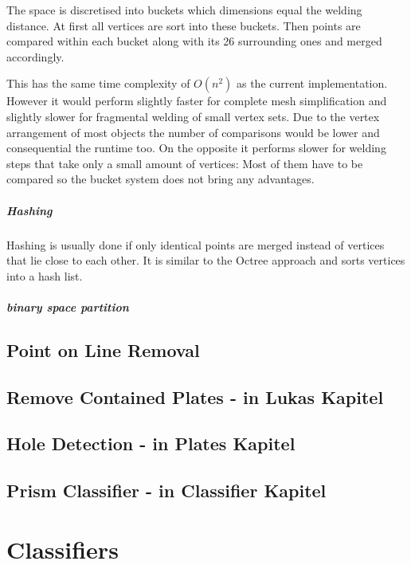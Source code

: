 \documentclass[../ClassicThesis.tex]{subfiles}
\begin{document}
The space is discretised into buckets which dimensions equal the welding distance. At first all vertices are sort into these buckets. Then points are compared within each bucket along with its 26 surrounding ones and merged accordingly.

This has the same time complexity of $O(n^2)$ as the current implementation. However it would perform slightly faster for complete mesh simplification and slightly slower for fragmental welding of small vertex sets. Due to the vertex arrangement of most objects the number of comparisons would be lower and consequential the runtime too. On the opposite it performs slower for welding steps that take only a small amount of vertices: Most of them have to be compared so the bucket system does not bring any advantages.

\paragraph{Hashing}

Hashing is usually done if only identical points are merged instead of vertices that lie close to each other. It is similar to the Octree approach and sorts vertices into a hash list. 

\paragraph{binary space partition}




\section{Point on Line Removal}

\section{Remove Contained Plates - in Lukas Kapitel}

\section{Hole Detection - in Plates Kapitel}

\section{Prism Classifier - in Classifier Kapitel}
\chapter{Classifiers}
\end{document}

